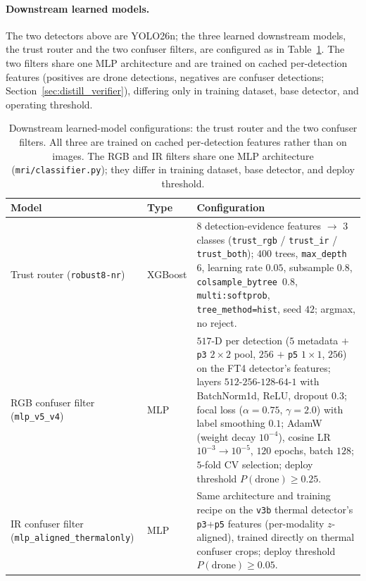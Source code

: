 \paragraph{Downstream learned models.} The two detectors above are YOLO26n; the three learned downstream models, the trust router and the two confuser filters, are configured as in Table~\ref{tab:downstream_configs}. The two filters share one MLP architecture and are trained on cached per-detection features (positives are drone detections, negatives are confuser detections; Section~\ref{sec:distill_verifier}), differing only in training dataset, base detector, and operating threshold.

\begin{table}[htbp]
    \centering
    \caption{Downstream learned-model configurations: the trust router and the two confuser filters. All three are trained on cached per-detection features rather than on images. The RGB and IR filters share one MLP architecture (\texttt{mri/classifier.py}); they differ in training dataset, base detector, and deploy threshold.}
    \label{tab:downstream_configs}
    \footnotesize
    \begin{tabular}{@{}p{3.1cm} l p{8.8cm}@{}}
        \toprule
        Model & Type & Configuration \\
        \midrule
        Trust router (\texttt{robust8-nr}) & XGBoost & $8$ detection-evidence features $\to$ $3$ classes (\texttt{trust\_rgb} / \texttt{trust\_ir} / \texttt{trust\_both}); $400$ trees, \texttt{max\_depth}~$6$, learning rate $0.05$, subsample $0.8$, \texttt{colsample\_bytree}~$0.8$, \texttt{multi:softprob}, \texttt{tree\_method=hist}, seed $42$; argmax, no reject. \\
        \addlinespace
        RGB confuser filter (\texttt{mlp\_v5\_v4}) & MLP & $517$-D per detection ($5$ metadata $+$ \texttt{p3} $2{\times}2$ pool, $256$ $+$ \texttt{p5} $1{\times}1$, $256$) on the FT4 detector's features; layers $512$-$256$-$128$-$64$-$1$ with BatchNorm1d, ReLU, dropout $0.3$; focal loss ($\alpha{=}0.75$, $\gamma{=}2.0$) with label smoothing $0.1$; AdamW (weight decay $10^{-4}$), cosine LR $10^{-3}\to 10^{-5}$, $120$ epochs, batch $128$; $5$-fold CV selection; deploy threshold $P(\text{drone})\geq 0.25$. \\
        \addlinespace
        IR confuser filter (\texttt{mlp\_aligned\_\allowbreak thermalonly}) & MLP & Same architecture and training recipe on the \texttt{v3b} thermal detector's \texttt{p3}+\texttt{p5} features (per-modality $z$-aligned), trained directly on thermal confuser crops; deploy threshold $P(\text{drone})\geq 0.05$. \\
        \bottomrule
    \end{tabular}
\end{table}

